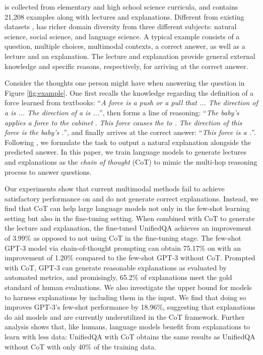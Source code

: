\name{} is collected from elementary and high school science curricula, and contains 21,208 examples along with lectures and explanations. Different from existing datasets \cite{kembhavi2016diagram,kembhavi2017you,sampat2020visuo}, \name{} has richer domain diversity from three different subjects: natural science, social science, and language science. A typical example consists of a question, multiple choices, multimodal contexts, a correct answer, as well as a lecture and an explanation. The lecture and explanation provide general external knowledge and specific reasons, respectively, for arriving at the correct answer.

Consider the thoughts one person might have when answering the question in Figure \ref{fig:example}. One first recalls the knowledge regarding the definition of a force learned from textbooks: ``\textit{A force is a push or a pull that ... The direction of a  is ... The direction of a  is ...}'', then forms a line of reasoning: ``\textit{The baby's  applies a force to the cabinet }.   \textit{This force causes the  to .}  \textit{The direction of this force is  the baby's .}'', and finally arrives at the correct answer: ``\textit{This force is a .}''. Following \cite{narang2020wt5}, we formulate the task to output a natural explanation alongside the predicted answer. In this paper, we train language models to generate lectures and explanations as the \textit{chain of thought} (CoT) to mimic the multi-hop reasoning process to answer \name{} questions. 

Our experiments show that current multimodal methods \cite{yu2019mcan,Anderson2017up,Kim2018,gao2019dynamic,li2019visualbert,lu2021iconqa} fail to achieve satisfactory performance on \name{} and do not generate correct explanations. Instead, we find that CoT can help large language models not only in the few-shot learning setting but also in the fine-tuning setting.
When combined with CoT to generate the lecture and explanation, the fine-tuned UnifiedQA \cite{khashabi2020unifiedqa} achieves an improvement of 3.99\% as opposed to not using CoT in the fine-tuning stage. The few-shot GPT-3 model \cite{chen2020big} via chain-of-thought prompting can obtain 75.17\% on \name{} with an improvement of 1.20\% compared to the few-shot GPT-3 without CoT. Prompted with CoT, GPT-3 can generate reasonable explanations as evaluated by automated metrics, and promisingly, 65.2\% of explanations meet the gold standard of human evaluations. We also investigate the upper bound for models to harness explanations by including them in the input. We find that doing so improves GPT-3's few-shot performance by 18.96\%, suggesting that explanations do aid models and are currently underutilized in the CoT framework. Further analysis shows that, like humans, language models benefit from explanations to learn with less data: UnifiedQA with CoT obtains the same results as UnifiedQA without CoT with only 40\% of the training data.

